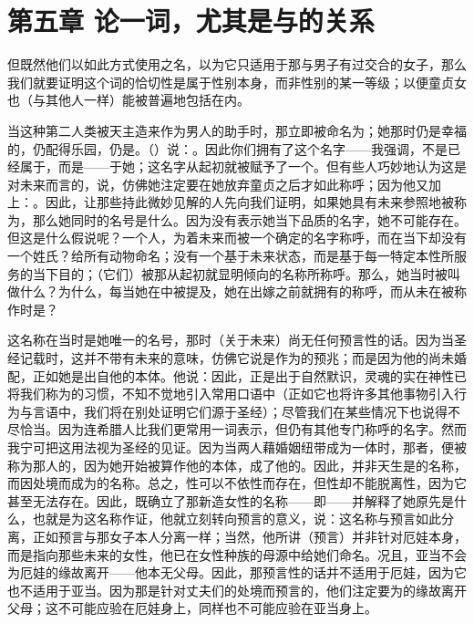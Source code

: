 \section{第五章 论一词，尤其是与的关系}

但既然他们以如此方式使用之名，以为它只适用于那与男子有过交合的女子，那么我们就要证明这个词的恰切性是属于性别本身，而非性别的某一等级；以便童贞女也（与其他人一样）能被普遍地包括在内。\par

当这种第二人类被天主造来作为男人的助手时，那立即被命名为；她那时仍是幸福的，仍配得乐园，仍是。（）说：。因此你们拥有了这个名字——我强调，不是已经属于，而是——于她；这名字从起初就被赋予了一个。但有些人巧妙地认为这是对未来而言的，说，仿佛她注定要在她放弃童贞之后才如此称呼；因为他又加上：。因此，让那些持此微妙见解的人先向我们证明，如果她具有未来参照地被称为，那么她同时的名号是什么。因为没有表示她当下品质的名字，她不可能存在。但这是什么假说呢？一个人，为着未来而被一个确定的名字称呼，而在当下却没有一个姓氏？给所有动物命名；没有一个基于未来状态，而是基于每一特定本性所服务的当下目的；（它们）被那从起初就显明倾向的名称所称呼。那么，她当时被叫做什么？为什么，每当她在中被提及，她在出嫁之前就拥有的称呼，而从未在被称作时是？\par

这名称在当时是她唯一的名号，那时（关于未来）尚无任何预言性的话。因为当圣经记载时，这并不带有未来的意味，仿佛它说是作为的预兆；而是因为他的尚未婚配，正如她是出自他的本体。他说：因此，正是出于自然默识，灵魂的实在神性已将我们称为的习惯，不知不觉地引入常用口语中（正如它也将许多其他事物引入行为与言语中，我们将在别处证明它们源于圣经）；尽管我们在某些情况下也说得不尽恰当。因为连希腊人比我们更常用一词表示，但仍有其他专门称呼的名字。然而我宁可把这用法视为圣经的见证。因为当两人藉婚姻纽带成为一体时，那者，便被称为那人的，因为她开始被算作他的本体，成了他的。因此，并非天生是的名称，而因处境而成为的名称。总之，性可以不依性而存在，但性却不能脱离性，因为它甚至无法存在。因此，既确立了那新造女性的名称——即——并解释了她原先是什么，也就是为这名称作证，他就立刻转向预言的意义，说：这名称与预言如此分离，正如预言与那女子本人分离一样；当然，他所讲（预言）并非针对厄娃本身，而是指向那些未来的女性，他已在女性种族的母源中给她们命名。况且，亚当不会为厄娃的缘故离开——他本无父母。因此，那预言性的话并不适用于厄娃，因为它也不适用于亚当。因为那是针对丈夫们的处境而预言的，他们注定要为的缘故离开父母；这不可能应验在厄娃身上，同样也不可能应验在亚当身上。\par

